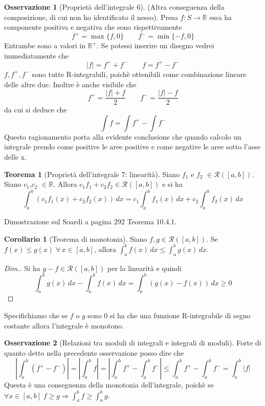 \documentclass{article}
\theoremstyle{definition}
\newtheorem{theorem}{Teorema}[section]
\theoremstyle{definition}
\theoremstyle{definition}
\theoremstyle{definition}
\newtheorem{remark}{Osservazione}[section]
\theoremstyle{definition}
\theoremstyle{definition}
\newtheorem{corollary}{Corollario}[theorem]
\begin{document}
\begin{remark}[Proprietà dell'integrale 6]
    (Altra conseguenza della composizione, di cui non ho identificato il nesso). Presa $f:S\rightarrow\mathbb{R}$ essa ha componente positiva e negativa che sono rispettivamente
    \[
        f^+=\max\lbrace f,0 \rbrace  \qquad f^-=\min\lbrace -f,0 \rbrace
    \]
    Entrambe sono a valori in $\mathbb{R}^+$. Se potessi inserire un disegno vedrei immediatamente che 
    \[
        |f|=f^++f^- \qquad f=f^+-f^-  
    \]
    $f,f^+,f^-$ sono tutte R-integrabili, poichè ottenibili come combinazione lineare delle altre due.
    Inoltre è anche visibile che
    \[
        f^+=\frac{|f|+f}{2} \qquad f^-=\frac{|f|-f}{2}
    \]
    da cui si deduce che 
    \[
        \int f = \int f^+ - \int f^-
    \]
    Questo ragionamento porta alla evidente conclusione che quando calcolo un integrale prendo come positive le aree positive e come negative le aree sotto l'asse delle x.
\end{remark}

\begin{theorem}[Proprietà dell'integrale 7: linearità]
    Siano $f_1$ e $f_2$ $\in\mathcal{R}([a,b])$. Siano $c_1$,$c_2$ $\in\mathbb{R}$. Allora $c_1f_1+c_2f_2\in\mathcal{R}([a,b])$ e si ha
        \[\int_a^b(c_1f_1(x)+c_2f_2(x))\,dx=c_1\int_a^bf_1(x)\,dx+c_2\int_a^bf_2(x)\,dx\]

    Dimostrazione sul Soardi a pagina 292 Teorema 10.4.1.
\end{theorem}

\begin{corollary}[Teorema di monotonia]
    Siano $f,g\in\mathcal{R}([a,b])$. Se $f(x)\leq g(x)\;\forall\,x\in[a,b]$, allora $\displaystyle{\int_a^b f(x)\,dx\leq\int_a^b g(x)\,dx}$.
    \begin{proof}[Dim.]
        Si ha $g-f\in\mathcal{R}([a,b])$ per la linearità e quindi
        \[\int_a^bg(x)\,dx-\int_a^bf(x)\,dx=\int_a^b(g(x)-f(x))\,dx\geq0\]
    \end{proof}

    Specifichiamo che se $f$ o $g$ sono 0 si ha che una funzione R-integrabile di segno costante allora l'integrale è monotono.
\end{corollary}

\begin{remark}[Relazioni tra moduli di integrali e integrali di moduli]
    Forte di quanto detto nella precedente osservazione posso dire che
    \[
        \left|\int_{a}^{b}(f^+-f^-)\right| = \left|\int_{a}^{b}f\right|=\left|\int_{a}^{b}f^+-\int_{a}^{b}f^- \right| \leq \int_{a}^{b}f^+-\int_{a}^{b}f^- = \int_{a}^{b} |f|
    \]
    Questa è una conseguenza della monotonia dell'integrale, poichè se $\forall x \in [a,b] \; f \geq g \Rightarrow \int_{a}^{b}f \geq \int_{a}^{b}g$.
\end{remark}
\end{document}
